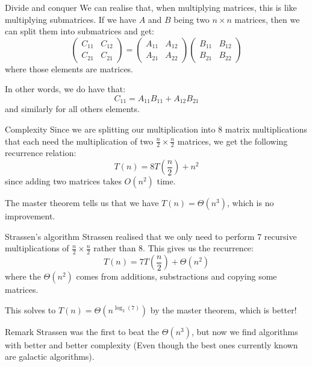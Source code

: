 \documentclass[a4paper]{article}
\begin{document}
\begin{parag}{Divide and conquer}
    We can realise that, when multiplying matrices, this is like multiplying submatrices. If we have $A$ and $B$ being two $n \times n$ matrices, then we can split them into submatrices and get: 
    \[\begin{pmatrix} C_{11} & C_{12} \\ C_{21}  & C_{21} \end{pmatrix} = \begin{pmatrix} A_{11} & A_{12} \\ A_{21} & A_{22} \end{pmatrix} \begin{pmatrix} B_{11} & B_{12} \\ B_{21} & B_{22} \end{pmatrix} \]
    where those elements are matrices.

    In other words, we do have that:
    \[C_{11} = A_{11} B_{11} + A_{12} B_{21}\]
    and similarly for all others elements.

    \begin{subparag}{Complexity}
        Since we are splitting our multiplication into 8 matrix multiplications that each need the multiplication of two $\frac{n}{2} \times \frac{n}{2}$ matrices, we get the following recurrence relation: 
        \[T\left(n\right) = 8T\left(\frac{n}{2}\right) + n^2\]
        since adding two matrices takes $O\left(n^2\right)$ time.

        The master theorem tells us that we have $T\left(n\right) = \Theta\left(n^3\right)$, which is no improvement.
    \end{subparag}
\end{parag}

\begin{parag}{Strassen's algorithm}
    Strassen realised that we only need to perform 7 recursive multiplications of $\frac{n}{2} \times \frac{n}{2}$ rather than $8$. This gives us the recurrence: 
    \[T\left(n\right) = 7T\left(\frac{n}{2}\right) + \Theta\left(n^2\right)\]
    where the $\Theta\left(n^2\right)$ comes from additions, substractions and copying some matrices.
    
    This solves to $T\left(n\right) = \Theta\left(n^{\log_2\left(7\right)}\right)$ by the master theorem, which is better!
\end{parag}

\begin{parag}{Remark}
    Strassen was the first to beat the $\Theta\left(n^3\right)$, but now we find algorithms with better and better complexity (Even though the best ones currently known are galactic algorithms).
\end{parag}
\end{document}
